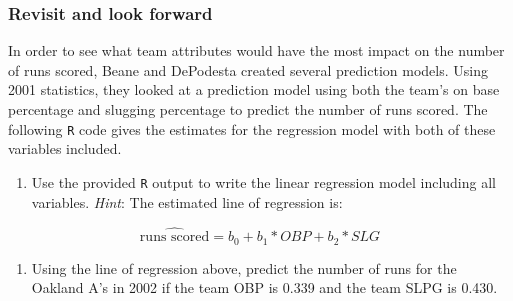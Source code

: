 \documentclass[
]{report}
\newenvironment{Shaded}{\begin{snugshade}}{\end{snugshade}}
\newcommand{\CommentTok}[1]{\textcolor[rgb]{0.56,0.35,0.01}{\textit{#1}}}
\newcommand{\DataTypeTok}[1]{\textcolor[rgb]{0.13,0.29,0.53}{#1}}
\newcommand{\DecValTok}[1]{\textcolor[rgb]{0.00,0.00,0.81}{#1}}
\newcommand{\KeywordTok}[1]{\textcolor[rgb]{0.13,0.29,0.53}{\textbf{#1}}}
\newcommand{\NormalTok}[1]{#1}
\newcommand{\OperatorTok}[1]{\textcolor[rgb]{0.81,0.36,0.00}{\textbf{#1}}}
\newcommand{\StringTok}[1]{\textcolor[rgb]{0.31,0.60,0.02}{#1}}
\providecommand{\tightlist}{%
  \setlength{\itemsep}{0pt}\setlength{\parskip}{0pt}}
\begin{document}
\newpage

\hypertarget{revisit-and-look-forward-4}{%
\subsubsection*{Revisit and look forward}\label{revisit-and-look-forward-4}}

In order to see what team attributes would have the most impact on the number of runs scored, Beane and DePodesta created several prediction models. Using 2001 statistics, they looked at a prediction model using both the team's on base percentage and slugging percentage to predict the number of runs scored. The following \texttt{R} code gives the estimates for the regression model with both of these variables included.

\begin{Shaded}
\end{Shaded}

\begin{enumerate}
\def\labelenumi{\arabic{enumi}.}
\setcounter{enumi}{20}
\tightlist
\item
  Use the provided \texttt{R} output to write the linear regression model including all variables. \emph{Hint}: The estimated line of regression is:
\end{enumerate}

\[\widehat{\text{runs scored}} = b_0 + b_1*OBP + b_2*SLG\]

\vspace{1in}

\begin{enumerate}
\def\labelenumi{\arabic{enumi}.}
\setcounter{enumi}{21}
\tightlist
\item
  Using the line of regression above, predict the number of runs for the Oakland A's in 2002 if the team OBP is 0.339 and the team SLPG is 0.430.
\end{enumerate}
\end{document}
